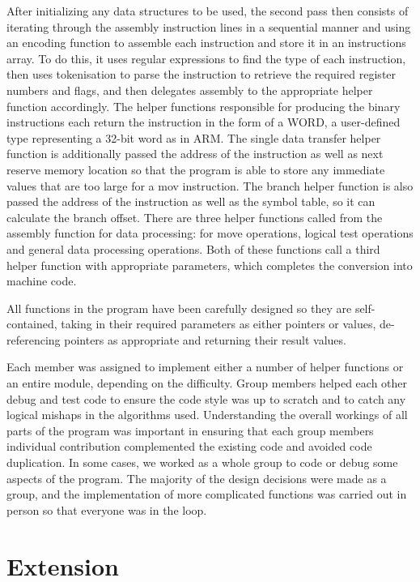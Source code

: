 \documentclass[11pt]{article}
\begin{document}
After initializing any data structures to be used, the second pass then consists of iterating through the assembly instruction lines in a sequential manner and using an encoding function to assemble each instruction and store it in an instructions array. To do this, it uses regular expressions to find the type of each instruction, then uses tokenisation to parse the instruction to retrieve the required register numbers and flags, and then delegates assembly to the appropriate helper function accordingly. 
The helper functions responsible for producing the binary instructions each return the instruction in the form of a WORD, a user-defined type representing a 32-bit word as in ARM. The single data transfer helper function is additionally passed the address of the instruction as well as next reserve memory location so that the program is able to store any immediate values that are too large for a mov instruction.
The branch helper function is also passed the address of the instruction as well as the symbol table, so it can calculate the branch offset.
There are three helper functions called from the assembly function for data processing: for move operations, logical test operations and general data processing operations. Both of these functions call a third helper function with appropriate parameters, which completes the conversion into machine code.

All functions in the program have been carefully designed so they are self-contained, taking in their required parameters as either pointers or values, de-referencing pointers as appropriate and returning their result values.

Each member was assigned to implement either a number of helper functions or an entire module, depending on the difficulty. Group members helped each other debug and test code to ensure the code style was up to scratch and to catch any logical mishaps in the algorithms used. Understanding the overall workings of all parts of the program was important in ensuring that each group members individual contribution complemented the existing code and avoided code duplication. In some cases, we worked as a whole group to code or debug some aspects of the program. The majority of the design decisions were made as a group, and the implementation of more complicated functions was carried out in person so that everyone was in the loop. 

\section{Extension}
\end{document}
